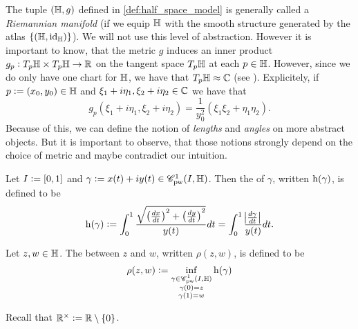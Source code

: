 \begin{remark}
	The tuple $(\mathbb{H},g)$ defined in \ref{def:half_space_model} is generally called a \emph{Riemannian manifold} (if we equip $\mathbb{H}$ with the smooth structure generated by the atlas $\cbr[0]{(\Hbb,\id_\Hbb)}$). We will not use this level of abstraction. However it is important to know, that the metric $g$ induces an inner product $g_p: T_p\mathbb{H} \times T_p\mathbb{H} \to \mathbb{R}$ on the tangent space $T_p\mathbb{H}$ at each $p \in \mathbb{H}$. However, since we do only have one chart for $\mathbb{H}$, we have that $T_p\mathbb{H} \approx \mathbb{C}$ (see \cite[67]{lee:smooth_manifolds:2013}). Explicitely, if $p := (x_0,y_0) \in \mathbb{H}$ and $\xi_1 + i\eta_1,\xi_2 + i\eta_2 \in \mathbb{C}$ we have that
	\begin{equation}
		g_p(\xi_1 + i\eta_1, \xi_2 + i\eta_2) = \frac{1}{y_0^2}(\xi_1\xi_2 + \eta_1\eta_2).
	\end{equation}
	Because of this, we can define the notion of \emph{lengths} and \emph{angles} on more abstract objects. But it is important to observe, that those notions strongly depend on the choice of metric and maybe contradict our intuition. 
\end{remark}

\begin{definition}
	Let $I := \intcc{0,1}$ and $\gamma := x(t) + iy(t) \in \mathscr{C}^1_{\mathrm{pw}}(I,\mathbb{H})$. Then the  of $\gamma$, written $\operatorname{h}(\gamma)$, is defined to be
	\begin{equation}
		\h(\gamma) := \int_0^1 \frac{\sqrt{\del[1]{\frac{dx}{dt}}^2 + \del[1]{\frac{dy}{dt}}^2}}{y(t)} dt = \int_0^1 \frac{\abs[1]{\frac{d\gamma}{dt}}}{y(t)}dt.
	\end{equation}
\end{definition}

\begin{definition}
	Let $z,w \in \mathbb{H}$. The  between $z$ and $w$, written $\rho(z,w)$, is defined to be
	\begin{equation}
		\rho(z,w) := \inf_{\substack{\gamma \in \mathscr{C}^1_{\mathrm{pw}}(I,\mathbb{H})\\ \gamma(0) = z\\ \gamma(1) = w}} \operatorname{h}(\gamma)
	\end{equation}
\end{definition}

Recall that $\Rbb^\times := \Rbb \setminus \cbr[0]{0}$.

